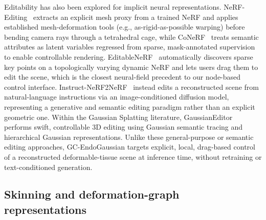 \documentclass[AMA,Times1COL]{WileyNJDv5} %
\begin{document}
Editability has also been explored for implicit neural representations. NeRF-Editing~\cite{yuan2022nerfediting} extracts an explicit mesh proxy from a trained NeRF and applies established mesh-deformation tools (e.g., as-rigid-as-possible warping) before bending camera rays through a tetrahedral cage, while CoNeRF~\cite{kania2022conerf} treats semantic attributes as latent variables regressed from sparse, mask-annotated supervision to enable controllable rendering. EditableNeRF~\cite{zheng2023editablenerf} automatically discovers sparse key points on a topologically varying dynamic NeRF and lets users drag them to edit the scene, which is the closest neural-field precedent to our node-based control interface. Instruct-NeRF2NeRF~\cite{haque2023instructnerf2nerf} instead edits a reconstructed scene from natural-language instructions via an image-conditioned diffusion model, representing a generative and semantic editing paradigm rather than an explicit geometric one. Within the Gaussian Splatting literature, GaussianEditor~\cite{chen2024gaussianeditor} performs swift, controllable 3D editing using Gaussian semantic tracing and hierarchical Gaussian representations. Unlike these general-purpose or semantic editing approaches, GC-EndoGaussian targets explicit, local, drag-based control of a reconstructed deformable-tissue scene at inference time, without retraining or text-conditioned generation.

\subsection{Skinning and deformation-graph representations}
\end{document}
